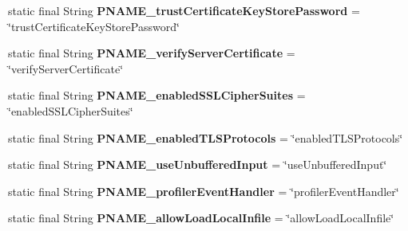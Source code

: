 \begin{DoxyCompactItemize}
static final String {\bfseries P\+N\+A\+M\+E\+\_\+trust\+Certificate\+Key\+Store\+Password} = \char`\"{}trust\+Certificate\+Key\+Store\+Password\char`\"{}
\item 
\mbox{\label{classcom_1_1mysql_1_1cj_1_1conf_1_1_property_definitions_a633bf1280aa9d9d124072153eedede13}} 
static final String {\bfseries P\+N\+A\+M\+E\+\_\+verify\+Server\+Certificate} = \char`\"{}verify\+Server\+Certificate\char`\"{}
\item 
\mbox{\label{classcom_1_1mysql_1_1cj_1_1conf_1_1_property_definitions_a823931e092bf8043b3b3a8df0fe23672}} 
static final String {\bfseries P\+N\+A\+M\+E\+\_\+enabled\+S\+S\+L\+Cipher\+Suites} = \char`\"{}enabled\+S\+S\+L\+Cipher\+Suites\char`\"{}
\item 
\mbox{\label{classcom_1_1mysql_1_1cj_1_1conf_1_1_property_definitions_adb5306564a1ebfa4f280e667bb312aae}} 
static final String {\bfseries P\+N\+A\+M\+E\+\_\+enabled\+T\+L\+S\+Protocols} = \char`\"{}enabled\+T\+L\+S\+Protocols\char`\"{}
\item 
\mbox{\label{classcom_1_1mysql_1_1cj_1_1conf_1_1_property_definitions_ae5ea77f325e9417b8c2382736867b966}} 
static final String {\bfseries P\+N\+A\+M\+E\+\_\+use\+Unbuffered\+Input} = \char`\"{}use\+Unbuffered\+Input\char`\"{}
\item 
\mbox{\label{classcom_1_1mysql_1_1cj_1_1conf_1_1_property_definitions_a96797d57b285cdeb881430e31330b2a0}} 
static final String {\bfseries P\+N\+A\+M\+E\+\_\+profiler\+Event\+Handler} = \char`\"{}profiler\+Event\+Handler\char`\"{}
\item 
\mbox{\label{classcom_1_1mysql_1_1cj_1_1conf_1_1_property_definitions_a2aaab6dc9f3c1dcdca005e79715dcef0}} 
static final String {\bfseries P\+N\+A\+M\+E\+\_\+allow\+Load\+Local\+Infile} = \char`\"{}allow\+Load\+Local\+Infile\char`\"{}
\item 
\mbox{\label{classcom_1_1mysql_1_1cj_1_1conf_1_1_property_definitions_a7fa319167190c7ccf5710033344c1047}} 

\end{DoxyCompactItemize}
